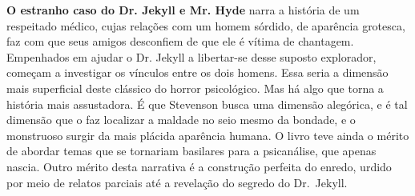 
\textbf{O estranho caso do Dr. Jekyll e Mr. Hyde} narra a história 
de um respeitado médico, cujas relações com um homem sórdido, 
de aparência grotesca, faz com que seus amigos desconfiem de que 
ele é vítima de chantagem. Empenhados em ajudar o Dr. Jekyll
a libertar-se desse suposto explorador, começam a investigar os 
vínculos entre os dois homens. Essa seria a dimensão mais 
superficial deste clássico do horror psicológico.
Mas há algo que torna a história mais assustadora. É que Stevenson
busca uma dimensão alegórica, e é tal dimensão que o faz localizar 
a maldade no seio mesmo da bondade, e o monstruoso surgir da mais 
plácida aparência humana. O livro teve ainda o mérito de abordar 
temas que se tornariam basilares para a psicanálise, que apenas
nascia. Outro mérito desta narrativa é a construção perfeita 
do enredo, urdido por meio de relatos parciais até a revelação 
do segredo do Dr.~Jekyll. 
        
